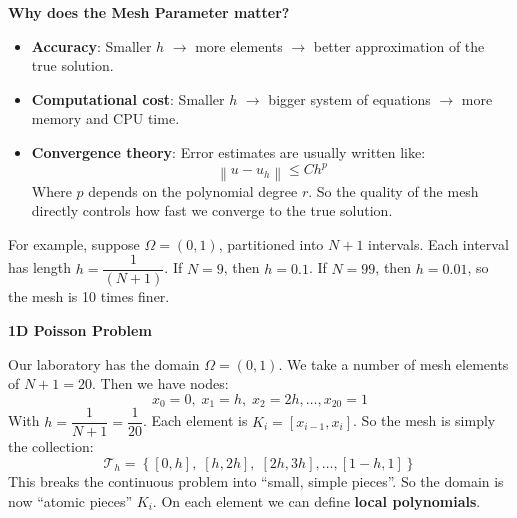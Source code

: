 \highspace
\textcolor{Green3}{ \textbf{Why does the Mesh Parameter matter?}}
\begin{itemize}
    \item \textbf{Accuracy}: Smaller $h$ $\rightarrow$ more elements $\rightarrow$ better approximation of the true solution.
    \item \textbf{Computational cost}: Smaller $h$ $\rightarrow$ bigger system of equations $\rightarrow$ more memory and CPU time.
    \item \textbf{Convergence theory}: Error estimates are usually written like:
    \begin{equation*}
        \left\|u - u_h\right\| \leq C h^{p}
    \end{equation*}
    Where $p$ depends on the polynomial degree $r$. So the quality of the mesh directly controls how fast we converge to the true solution.
\end{itemize}
For example, suppose $\Omega = (0,1)$, partitioned into $N+1$ intervals. Each interval has length $h = \dfrac{1}{\left(N+1\right)}$. If $N = 9$, then $h = 0.1$. If $N = 99$, then $h = 0.01$, so the mesh is 10 times finer.

\highspace
\begin{flushleft}
    \textcolor{Green3}{ \textbf{1D Poisson Problem}}
\end{flushleft}
Our laboratory has the domain $\Omega = \left(0, 1\right)$. We take a number of mesh elements of $N+1 = 20$. Then we have nodes:
\begin{equation*}
    x_0 = 0, \; x_1 = h, \; x_2 = 2h, \dots, x_{20} = 1
\end{equation*}
With $h = \dfrac{1}{N + 1} = \dfrac{1}{20}$. Each element is $K_{i} = \left[x_{i-1}, x_{i}\right]$. So the mesh is simply the collection:
\begin{equation*}
    \mathcal{T}_{h} = \left\{
        \left[0, h\right], \;
        \left[h, 2h\right], \;
        \left[2h, 3h\right], \dots,
        \left[1-h, 1\right]
    \right\}
\end{equation*}
This breaks the continuous problem into ``small, simple pieces''. So the domain is now ``atomic pieces'' $K_{i}$. On each element we can define \textbf{local polynomials}. 

